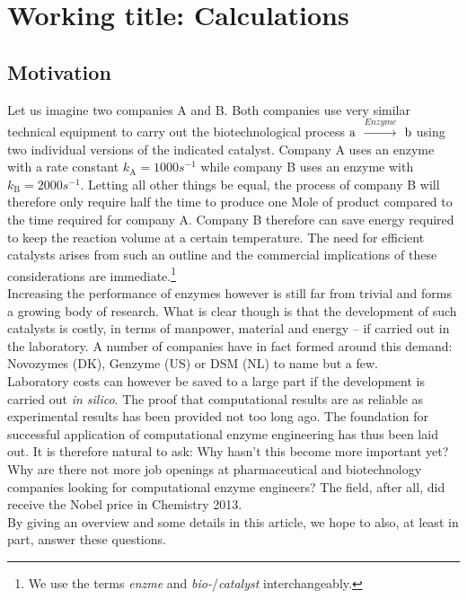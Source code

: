 \chapter[Working title: Calculations]
{Working title: Calculations\label{ch1}}


\section{Motivation}\label{sec:mot}
Let us imagine two companies A and B.
Both companies use very similar technical equipment to carry out the biotechnological process $\ce{a}$ $\xrightarrow{Enzyme}$ $\ce{b}$ using two individual versions of the indicated catalyst.
Company A uses an enzyme with a rate constant $k_\text{A} = 1000s^{-1}$ while company B uses an enzyme with $k_\text{B} = 2000s^{-1}$.
Letting all other things be equal, the process of company B will therefore only require half the time to produce one Mole of product compared to the time required for company A.
Company B therefore can save energy required to keep the reaction volume at a certain temperature.
The need for efficient catalysts arises from such an outline and the commercial implications of these considerations are immediate.\footnote{We use the terms \textit{enzme} and \textit{bio-}/\textit{catalyst} interchangeably.}\\
Increasing the performance of enzymes however is still far from trivial and forms a growing body of research.
What is clear though is that the development of such catalysts is costly, in terms of manpower, material and energy -- if carried out in the laboratory.
A number of companies have in fact formed around this demand: Novozymes (DK), Genzyme (US) or DSM (NL) to name but a few\cite{meyer2013use}.\\
Laboratory costs can however be saved to a large part if the development is carried out \textit{in silico}.
The proof that computational results are as reliable as experimental results has been provided not too long ago\cite{claeyssens2006high}.
The foundation for successful application of computational enzyme engineering has thus been laid out.
It is therefore natural to ask: Why hasn't this become more important yet?
Why are there not more job openings at pharmaceutical and biotechnology companies looking for computational enzyme engineers?
The field, after all, did receive the Nobel price in Chemistry 2013.\\
By giving an overview and some details in this article, we hope to also, at least in part, answer these questions.


